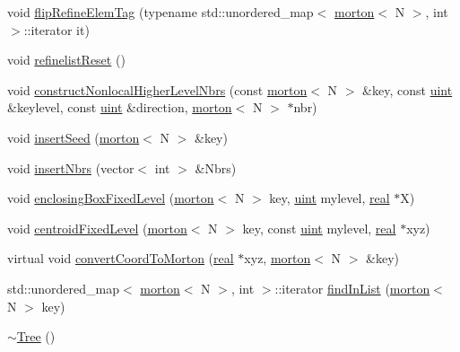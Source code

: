 \begin{DoxyCompactItemize}
void \mbox{\hyperlink{classTree_a77e16d7a249bca09cf3deff800b85789}{flip\+Refine\+Elem\+Tag}} (typename std\+::unordered\+\_\+map$<$ \mbox{\hyperlink{definitions_8h_af8682350bd8bb38ee9023f7a0a310add}{morton}}$<$ N $>$, int $>$\+::iterator it)
\item 
void \mbox{\hyperlink{classTree_aa07840353d0eb24fe3af3ddf348f3378}{refinelist\+Reset}} ()
\item 
void \mbox{\hyperlink{classTree_ab93adb07d37664f0e359eb8ea9cf56d1}{construct\+Nonlocal\+Higher\+Level\+Nbrs}} (const \mbox{\hyperlink{definitions_8h_af8682350bd8bb38ee9023f7a0a310add}{morton}}$<$ N $>$ \&key, const \mbox{\hyperlink{definitions_8h_a69aa29b598b851b0640aa225a9e5d61d}{uint}} \&keylevel, const \mbox{\hyperlink{definitions_8h_a69aa29b598b851b0640aa225a9e5d61d}{uint}} \&direction, \mbox{\hyperlink{definitions_8h_af8682350bd8bb38ee9023f7a0a310add}{morton}}$<$ N $>$ $\ast$nbr)
\item 
void \mbox{\hyperlink{classTree_a9e11471977b8d0079c204b858357f339}{insert\+Seed}} (\mbox{\hyperlink{definitions_8h_af8682350bd8bb38ee9023f7a0a310add}{morton}}$<$ N $>$ \&key)
\item 
void \mbox{\hyperlink{classTree_acbedf93a6977d60abc4f08c789c7c30e}{insert\+Nbrs}} (vector$<$ int $>$ \&Nbrs)
\item 
void \mbox{\hyperlink{classTree_a49dcce2706c8e330950ac362826c3a9d}{enclosing\+Box\+Fixed\+Level}} (\mbox{\hyperlink{definitions_8h_af8682350bd8bb38ee9023f7a0a310add}{morton}}$<$ N $>$ key, \mbox{\hyperlink{definitions_8h_a69aa29b598b851b0640aa225a9e5d61d}{uint}} mylevel, \mbox{\hyperlink{definitions_8h_aedc0ad84d1e764530814f57ad931d02a}{real}} $\ast$X)
\item 
void \mbox{\hyperlink{classTree_a50c5721c4b9535029e4700419bec234c}{centroid\+Fixed\+Level}} (\mbox{\hyperlink{definitions_8h_af8682350bd8bb38ee9023f7a0a310add}{morton}}$<$ N $>$ key, const \mbox{\hyperlink{definitions_8h_a69aa29b598b851b0640aa225a9e5d61d}{uint}} mylevel, \mbox{\hyperlink{definitions_8h_aedc0ad84d1e764530814f57ad931d02a}{real}} $\ast$xyz)
\item 
virtual void \mbox{\hyperlink{classTree_a945d137d27bb55d9feb5762ac821572a}{convert\+Coord\+To\+Morton}} (\mbox{\hyperlink{definitions_8h_aedc0ad84d1e764530814f57ad931d02a}{real}} $\ast$xyz, \mbox{\hyperlink{definitions_8h_af8682350bd8bb38ee9023f7a0a310add}{morton}}$<$ N $>$ \&key)
\item 
std\+::unordered\+\_\+map$<$ \mbox{\hyperlink{definitions_8h_af8682350bd8bb38ee9023f7a0a310add}{morton}}$<$ N $>$, int $>$\+::iterator \mbox{\hyperlink{classTree_a9462adc7e7806404cc1b75d9a26894ae}{find\+In\+List}} (\mbox{\hyperlink{definitions_8h_af8682350bd8bb38ee9023f7a0a310add}{morton}}$<$ N $>$ key)
\item 
\mbox{\hyperlink{classTree_afcec6e88f6434550c3abf3185a25ff53}{$\sim$\+Tree}} ()
\end{DoxyCompactItemize}

